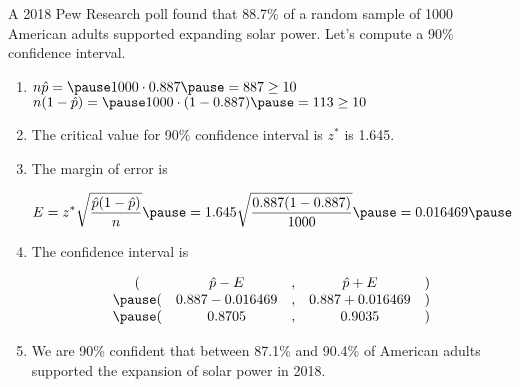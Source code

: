 \documentclass{beamer}
\begin{document}
\begin{frame}
  \begin{example}
    A 2018 Pew Research poll found that 88.7\% of a random sample of 1000 American adults supported expanding solar power. Let's compute a 90\% confidence interval.\pause

    \vspace{1mm}
    \begin{enumerate}
    \item $n\hat{p}=\pause 1000\cdot 0.887\pause =887\geq 10$\\\pause $n(1-\hat{p})=\pause1000\cdot(1-0.887)\pause=113\geq 10$\pause
    \item The critical value for 90\% confidence interval is $z^{*}$ is 1.645.\pause
    \item The margin of error is

      \vspace{-6mm}
      \begin{equation*}
        E=z^{*}\sqrt{\dfrac{\hat{p}(1-\hat{p})}{n}}\pause
        =1.645\sqrt{\dfrac{0.887(1-0.887)}{1000}}\pause
        = 0.016469\pause
      \end{equation*}
      \vspace{-5mm}
    \item The confidence interval is

      \vspace{-3mm}
      \begin{equation*}
        \begin{matrix}
          ( & \hat{p} - E &,& \hat{p} + E & )\\\pause
          ( & 0.887 - 0.016469 &,& 0.887 + 0.016469 & ) \\\pause
          ( & 0.8705 &,& 0.9035 & ) \\
        \end{matrix}
      \end{equation*}

      \vspace{-2mm}\pause
      \item We are 90\% confident that between 87.1\% and 90.4\% of American adults supported the expansion of solar power in 2018.
    \end{enumerate}
  \end{example}
\end{frame}
\end{document}
